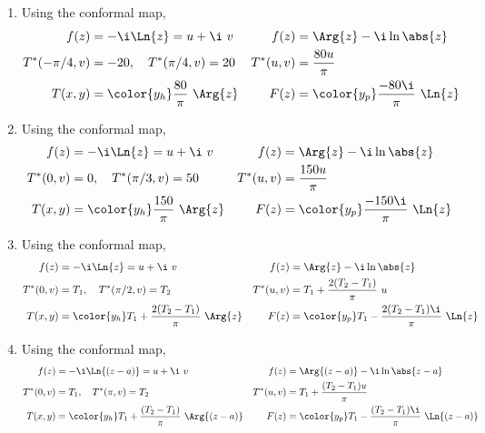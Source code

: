 \begin{enumerate}
    \item Using the conformal map,
          \begin{align}
              f(z)           & = -\i \Ln{z} = u + \i\ v                &
              f(z)           & = \Arg{z} - \i \ln \abs{z}                \\
              T^*(-\pi/4, v) & = -20, \quad T^*(\pi/4, v) = 20         &
              T^*(u, v)      & = \frac{80u}{\pi}                         \\
              T(x, y)        & = \color{y_h} \frac{80}{\pi}\ \Arg{z}   &
              F(z)           & = \color{y_p} \frac{-80\i}{\pi}\ \Ln{z}
          \end{align}

    \item Using the conformal map,
          \begin{align}
              f(z)      & = -\i \Ln{z} = u + \i\ v                 &
              f(z)      & = \Arg{z} - \i \ln \abs{z}                 \\
              T^*(0, v) & = 0, \quad T^*(\pi/3, v) = 50            &
              T^*(u, v) & = \frac{150u}{\pi}                         \\
              T(x, y)   & = \color{y_h} \frac{150}{\pi}\ \Arg{z}   &
              F(z)      & = \color{y_p} \frac{-150\i}{\pi}\ \Ln{z}
          \end{align}

    \item Using the conformal map,
          \begin{align}
              f(z)      & = -\i \Ln{z} = u + \i\ v                               &
              f(z)      & = \Arg{z} - \i \ln \abs{z}                               \\
              T^*(0, v) & = T_1, \quad T^*(\pi/2, v) = T_2                       &
              T^*(u, v) & = T_1 + \frac{2(T_2 - T_1)}{\pi}\ u                      \\
              T(x, y)   & = \color{y_h} T_1 + \frac{2(T_2 - T_1)}{\pi}\ \Arg{z}  &
              F(z)      & = \color{y_p} T_1 - \frac{2(T_2 - T_1)\i}{\pi}\ \Ln{z}
          \end{align}

    \item Using the conformal map,
          \begin{align}
              f(z)            & = -\i \Ln{(z - a)} = u + \i\ v                &
              f(z)            & = \Arg{(z - a)} - \i \ln \abs{z - a}            \\
              T^*(0, v)       & = T_1, \quad T^*(\pi, v) = T_2                &
              T^*(u, v)       & = T_1 + \frac{(T_2 - T_1)u}{\pi}                \\
              T(x, y)         & = \color{y_h} T_1 + \frac{(T_2 - T_1)}{\pi}
              \ \Arg{(z - a)} &
              F(z)            & = \color{y_p} T_1 - \frac{(T_2 - T_1)\i}{\pi}
              \ \Ln{(z - a)}
          \end{align}


\end{enumerate}
